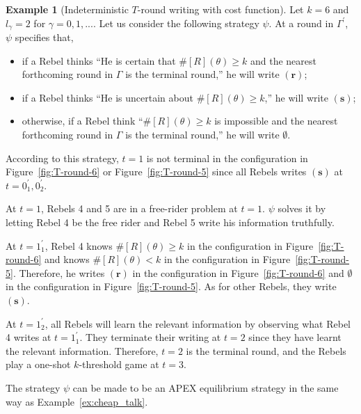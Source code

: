 \documentclass[12pt,letter]{article}
\theoremstyle{definition}
\newtheorem{example}{Example}
\theoremstyle{remark}
\theoremstyle{claim}
\begin{document}

\begin{example}[Indeterministic $T$-round writing with cost function]
\label{ex:cost_function_talk_solve_fr_Indm}
Let $k=6$ and $l_{\gamma}=2$ for $\gamma=0,1,...$. Let us consider the following strategy $\psi$. At a round in $\Gamma^{'}$, $\psi$ specifies that, 
\begin{itemize}
\item if a Rebel thinks ``He is certain that $\#[R](\theta)\geq k$ and the nearest forthcoming round in $\Gamma$ is the terminal round,'' he will write $(\textbf{r})$;
\item if a Rebel thinks ``He is uncertain about $\# [R](\theta)\geq k$,'' he will write $(\textbf{s})$;
\item otherwise, if a Rebel think ``$\#[R](\theta)\geq k$ is impossible and the nearest forthcoming round in $\Gamma$ is the terminal round,'' he will write $\emptyset$. 
\end{itemize}

According to this strategy, $t=1$ is not terminal in the configuration in Figure~\ref{fig:T-round-6} or Figure~\ref{fig:T-round-5} since all Rebels writes $(\textbf{s})$ at $t=0^{'}_1,0^{'}_2$. 

At $t=1$, Rebels 4 and 5 are in a free-rider problem at $t=1$. $\psi$ solves it by letting Rebel 4 be the free rider and Rebel 5 write his information truthfully. 

At $t=1^{'}_1$, Rebel 4 knows $\#[R](\theta)\geq k$ in the configuration in Figure~\ref{fig:T-round-6} and knows $\#[R](\theta)< k$ in the configuration in Figure~\ref{fig:T-round-5}. Therefore, he writes $(\textbf{r})$ in the configuration in Figure~\ref{fig:T-round-6} and $\emptyset$ in the configuration in Figure~\ref{fig:T-round-5}. As for other Rebels, they write $(\textbf{s})$. 

At $t=1^{'}_2$, all Rebels will learn the relevant information by observing what Rebel 4 writes at $t=1^{'}_1$. They terminate their writing at $t=2$ since they have learnt the relevant information. Therefore, $t=2$ is the terminal round, and the Rebels play a one-shot $k$-threshold game at $t=3$.

The strategy $\psi$ can be made to be an APEX equilibrium strategy in the same way as Example~\ref{ex:cheap_talk}. 


\end{example}
\end{document}
